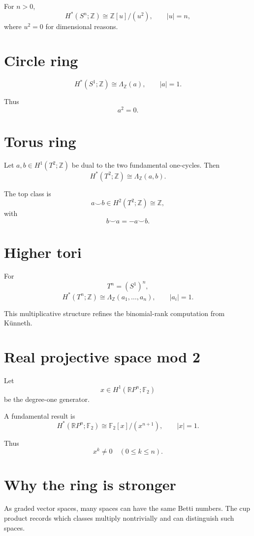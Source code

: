 For \(n>0\),
\[
H^*(S^n;\mathbb Z)
\cong
\mathbb Z[u]/(u^2),
\qquad |u|=n,
\]
where \(u^2=0\) for dimensional reasons.

\section{Circle ring}

\[
H^*(S^1;\mathbb Z)
\cong
\Lambda_{\mathbb Z}(a),
\qquad |a|=1.
\]

Thus
\[
a^2=0.
\]

\section{Torus ring}

Let \(a,b\in H^1(T^2;\mathbb Z)\) be dual to the two fundamental one-cycles.
Then
\[
H^*(T^2;\mathbb Z)
\cong
\Lambda_{\mathbb Z}(a,b).
\]

The top class is
\[
a\smile b\in H^2(T^2;\mathbb Z)\cong\mathbb Z,
\]
with
\[
b\smile a=-a\smile b.
\]

\section{Higher tori}

For
\[
T^n=(S^1)^n,
\]
\[
H^*(T^n;\mathbb Z)
\cong
\Lambda_{\mathbb Z}(a_1,\dots,a_n),
\qquad |a_i|=1.
\]

This multiplicative structure refines the binomial-rank computation from
Künneth.

\section{Real projective space mod 2}

Let
\[
x\in H^1(\mathbb RP^n;\mathbb F_2)
\]
be the degree-one generator.

A fundamental result is
\[
H^*(\mathbb RP^n;\mathbb F_2)
\cong
\mathbb F_2[x]/(x^{n+1}),
\qquad |x|=1.
\]

Thus
\[
x^k\ne0\quad(0\le k\le n).
\]

\section{Why the ring is stronger}

As graded vector spaces, many spaces can have the same Betti numbers.  The cup
product records which classes multiply nontrivially and can distinguish such
spaces.

